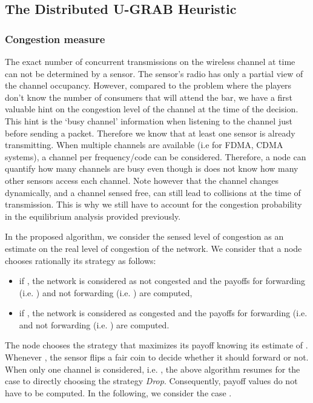 \documentclass[journal, peerreview, onecolumn, draftcls]{IEEEtran}
\begin{document}
\subsection{The Distributed U-GRAB Heuristic}

\subsubsection{Congestion measure}
The exact number of concurrent transmissions on the wireless channel at time  can not be determined by a sensor. The sensor's radio has only a partial view of the channel occupancy. However, compared to the problem where the players don't know the number of consumers that will attend the bar, we have a first valuable hint on the congestion level of the channel at the time of the decision. This hint is the `busy channel' information when listening to the channel just before sending a packet. Therefore we know that at least one sensor is already transmitting. When multiple channels are available (i.e for FDMA, CDMA systems), a channel per frequency/code can be considered. Therefore, a node can quantify how many channels are busy even though is does not know how many other sensors access each channel. Note however that the channel changes dynamically, and a channel sensed free, can still lead to collisions at the time of transmission. This is why we still have to account for the congestion probability in the equilibrium analysis provided previously.

In the proposed algorithm, we consider the sensed level of congestion  as an estimate on the real level of congestion  of the network. We consider that a node chooses rationally its strategy as follows:
\begin{itemize}
\item if  , the network is considered as not congested and the payoffs for forwarding  (i.e. ) and not forwarding (i.e. ) are computed,
\item if , the network is considered as congested and the payoffs for forwarding (i.e.  and not forwarding (i.e. ) are computed.
\end{itemize}
The node chooses the strategy that maximizes its payoff knowing its estimate of . Whenever , the sensor flips a fair coin to decide whether it should forward or not.
When only one channel is considered, i.e. , the above algorithm resumes for the case  to directly choosing the strategy {\it Drop}. Consequently, payoff values do not have to be computed. In the following, we consider the case .
\end{document}
